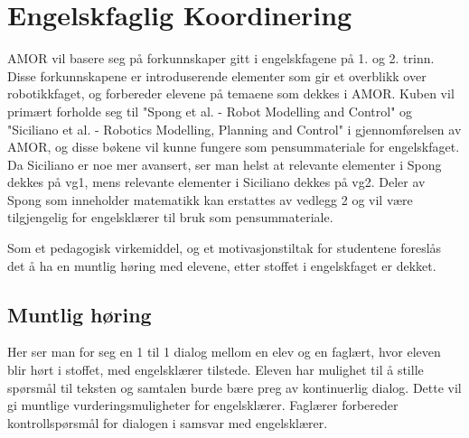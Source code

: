 \section*{Engelskfaglig Koordinering} \label{Sec: Engelskfaglig_Koordinering}

AMOR vil basere seg på forkunnskaper gitt i engelskfagene på 1. og 2. trinn.
Disse forkunnskapene er introduserende elementer som gir et overblikk over robotikkfaget, og forbereder elevene på temaene som dekkes i AMOR.
Kuben vil primært forholde seg til "Spong et al. - Robot Modelling and Control" og "Siciliano et al. - Robotics Modelling, Planning and Control" i gjennomførelsen av AMOR, og disse bøkene vil kunne fungere som pensummateriale for engelskfaget.
Da Siciliano er noe mer avansert, ser man helst at relevante elementer i Spong dekkes på vg1, mens relevante elementer i Siciliano dekkes på vg2.
Deler av Spong som inneholder matematikk kan erstattes av vedlegg 2 og vil være tilgjengelig for engelsklærer til bruk som pensummateriale.

Som et pedagogisk virkemiddel, og et motivasjonstiltak for studentene foreslås det å ha en muntlig høring med elevene, etter stoffet i engelskfaget er dekket.

	\subsection*{Muntlig høring}
			Her ser man for seg en 1 til 1 dialog mellom en elev og en faglært, hvor eleven blir hørt i stoffet, med engelsklærer tilstede.
			Eleven har mulighet til å stille spørsmål til teksten og samtalen burde bære preg av kontinuerlig dialog. Dette vil gi muntlige vurderingsmuligheter for engelsklærer. Faglærer forbereder kontrollspørsmål for dialogen i samsvar med engelsklærer.
